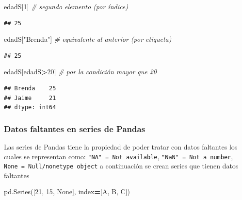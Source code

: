 \documentclass[
]{book}
\newenvironment{Shaded}{\begin{snugshade}}{\end{snugshade}}
\newcommand{\CommentTok}[1]{\textcolor[rgb]{0.56,0.35,0.01}{\textit{#1}}}
\newcommand{\DecValTok}[1]{\textcolor[rgb]{0.00,0.00,0.81}{#1}}
\newcommand{\NormalTok}[1]{#1}
\newcommand{\OperatorTok}[1]{\textcolor[rgb]{0.81,0.36,0.00}{\textbf{#1}}}
\newcommand{\StringTok}[1]{\textcolor[rgb]{0.31,0.60,0.02}{#1}}
\newcommand{\VariableTok}[1]{\textcolor[rgb]{0.00,0.00,0.00}{#1}}
\theoremstyle{definition}
\theoremstyle{definition}
\theoremstyle{definition}
\theoremstyle{definition}
\theoremstyle{remark}
\begin{document}
\begin{Shaded}
\begin{Highlighting}[]
\NormalTok{edadS[}\DecValTok{1}\NormalTok{] }\CommentTok{\# segundo elemento (por índice)}
\end{Highlighting}
\end{Shaded}

\begin{verbatim}
## 25
\end{verbatim}

\begin{Shaded}
\begin{Highlighting}[]
\NormalTok{edadS[}\StringTok{"Brenda"}\NormalTok{] }\CommentTok{\# equivalente al anterior (por etiqueta)}
\end{Highlighting}
\end{Shaded}

\begin{verbatim}
## 25
\end{verbatim}

\begin{Shaded}
\begin{Highlighting}[]
\NormalTok{edadS[edadS}\OperatorTok{\textgreater{}}\DecValTok{20}\NormalTok{] }\CommentTok{\# por la condición mayor que 20  }
\end{Highlighting}
\end{Shaded}

\begin{verbatim}
## Brenda    25
## Jaime     21
## dtype: int64
\end{verbatim}

\hypertarget{datos-faltantes-en-series-de-pandas}{%
\subsubsection{Datos faltantes en series de Pandas}\label{datos-faltantes-en-series-de-pandas}}

Las series de Pandas tiene la propiedad de poder tratar con datos faltantes los cuales se representan como: \texttt{"NA"\ =\ Not\ available}, \texttt{"NaN"\ =\ Not\ a\ number}, \texttt{None\ =\ Null/nonetype\ object} a continuación se crean series que tienen datos faltantes

\begin{Shaded}
\begin{Highlighting}[]
\NormalTok{pd.Series([}\DecValTok{21}\NormalTok{, }\DecValTok{15}\NormalTok{, }\VariableTok{None}\NormalTok{], index}\OperatorTok{=}\NormalTok{[}\StringTok{\textquotesingle{}A\textquotesingle{}}\NormalTok{, }\StringTok{\textquotesingle{}B\textquotesingle{}}\NormalTok{, }\StringTok{\textquotesingle{}C\textquotesingle{}}\NormalTok{]) }
\end{Highlighting}
\end{Shaded}
\end{document}
